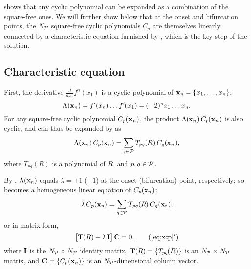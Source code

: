 \documentclass{ws-ijbc}
\begin{document}
  shows that any cyclic polynomial can be expanded
  as a combination of the square-free ones.
We will further show below that
  at the onset and bifurcation points,
  the $N_\mathcal P$ square-free cyclic polynomials $C_p$ are themselves
  linearly connected by a characteristic equation
  furnished by ,
  which is the key step of the solution.




\subsection{\label{sec:algo}Characteristic equation}




First, the derivative $\frac{d}{dx_1}f^n(x_1)$ is
  a cyclic polynomial of $\mathbf{x}_{n} = \{x_1, \ldots, x_n\}$:
%
%
\begin{equation}
  \Lambda(\mathbf{x}_{n})
   = f'(x_n) \dots f'(x_1)
   = (-2)^n x_1 \dots x_n.
\label{eq:logder}
\end{equation}
%
%
For any square-free cyclic polynomial $C_p(\mathbf{x}_{n})$,
the product $\Lambda(\mathbf{x}_{n}) \, C_p(\mathbf{x}_{n})$ is also cyclic,
  and can thus be expanded by  as
\begin{equation}
  \Lambda(\mathbf{x}_{n}) \, C_p(\mathbf{x}_{n}) = \sum_{q \in \mathcal P} T_{pq}(R) \, C_q(\mathbf{x}_{n}),
\label{eq:xcp0}
\end{equation}
where $T_{pq}(R)$ is a polynomial of $R$,
and $p, q \in \mathcal P$.



By ,
  $\Lambda(\mathbf{x}_{n})$ equals $\lambda = +1$ ($-1$)
  at the onset (bifurcation) point,
  respectively;
  so 
  becomes a homogeneous linear equation of
  $C_p(\mathbf{x}_{n})$:
\begin{equation}
  \lambda \, C_p(\mathbf{x}_{n}) = \sum_{q \in \mathcal P} T_{pq}(R) \, C_q(\mathbf{x}_{n}),
\label{eq:xcp}
\end{equation}
%
%
or in matrix form,
\begin{equation}
  \big[ \vct T(R) - \lambda \, \vct I \big] \, \vct C = 0,
\tag{\ref{eq:xcp}$'$}
\end{equation}
%
%
where
$\mathbf{I}$ is the $N_\mathcal P \times N_\mathcal P$ identity matrix,
$\mathbf{T}(R) = \{T_{pq}(R)\}$ is an $N_\mathcal P \times N_\mathcal P$ matrix,
and
$\mathbf{C} = \{C_p(\mathbf{x}_{n})\}$ is an $N_\mathcal P$-dimensional column vector.
\end{document}
